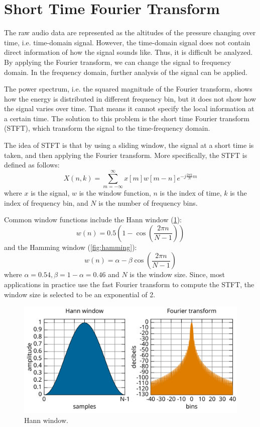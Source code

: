 \documentclass[12pt,final,twoside]{report}
\theoremstyle{plain}
\theoremstyle{definition}
\theoremstyle{remark}
\begin{document}
\section{Short Time Fourier Transform}
The raw audio data are represented as the altitudes of the pressure changing over time, i.e. time-domain signal. However, the time-domain signal does not contain direct information of how the signal sounds like. Thus, it is difficult be analyzed. By applying the Fourier transform, we can change the signal to frequency domain. In the frequency domain, further analysis of the signal can be applied.

The power spectrum, i.e. the squared magnitude of the Fourier transform, shows how the energy is distributed in different frequency bin, but it does not show how the signal varies over time. That means it cannot specify the local information at a certain time. The solution to this problem is the short time Fourier transform (STFT), which transform the signal to the time-frequency domain.

The idea of STFT is that by using a sliding window, the signal at a short time is taken, and then applying the Fourier transform. More specifically, the STFT is defined as follows:
\begin{equation}
  X(n, k) = \sum_{m = -\infty}^{\infty} x[m]w[m-n]e^{-j \frac{2\pi k}{N} m}
\end{equation}
where $x$ is the signal, $w$ is the window function, $n$ is the index of time, $k$ is the index of frequency bin, and $N$ is the number of frequency bins. 

Common window functions include the Hann window (\cref{fig:hann}):
\begin{equation} w(n) = 0.5 (1 - \cos(\frac{2\pi n}{N-1})) \end{equation}
and the Hamming window (\cref{fig:hamming}):
\begin{equation} w(n) = \alpha - \beta \cos(\frac{2\pi n}{N-1}) \end{equation}
where $\alpha = 0.54, \beta = 1 - \alpha = 0.46$ and $N$ is the window size.
Since, most applications in practice use the fast Fourier transform to compute the STFT, the window size is selected to be an exponential of 2.

\begin{figure}[t]
  \centering
  \includegraphics[width=.6\textwidth]{hann}
  \caption{Hann window.}
  \label{fig:hann}
\end{figure}
\end{document}
